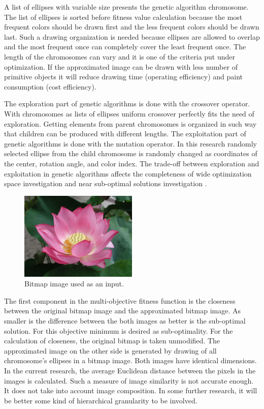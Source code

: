 \documentclass[conference]{IEEEtran}
\begin{document}
A list of ellipses with variable size presents the genetic algorithm chromosome. The list of ellipses is sorted before fitness value calculation because the most frequent colors should be drawn first and the less frequent colors should be drawn last. Such a drawing organization is needed because ellipses are allowed to overlap and the most frequent once can completely cover the least frequent once. The length of the chromosomes can vary and it is one of the criteria put under optimization. If the approximated image can be drawn with less number of primitive objects it will reduce drawing time (operating efficiency) and paint consumption (cost efficiency). 

The exploration part of genetic algorithms is done with the crossover operator. With chromosomes as lists of ellipses uniform crossover perfectly fits the need of exploration. Getting elements from parent chromosomes is organized in such way that children can be produced with different lengths. The exploitation part of genetic algorithms is done with the mutation operator. In this research randomly selected ellipse from the child chromosome is randomly changed as coordinates of the center, rotation angle, and color index. The trade-off between exploration and exploitation in genetic algorithms affects the completeness of wide optimization space investigation and near sub-optimal solutions investigation \cite{Hussain-Muhammad-2020}.

\begin{figure}[htbp]
\centerline{\includegraphics[width=0.5\textwidth]{fig01.png}}
\caption{Bitmap image used as an input.}
\label{fig01}
\end{figure}

The first component in the multi-objective fitness function is the closeness between the original bitmap image and the approximated bitmap image. As smaller is the difference between the both images as better is the sub-optimal solution. For this objective minimum is desired as sub-optimality. For the calculation of closeness, the original bitmap is taken unmodified. The approximated image on the other side is generated by drawing of all chromosome's ellipses in a bitmap image. Both images have identical dimensions. In the current research, the average Euclidean distance between the pixels in the images is calculated. Such a measure of image similarity is not accurate enough. It does not take into account image composition. In some further research, it will be better some kind of hierarchical granularity to be involved. 
\end{document}
